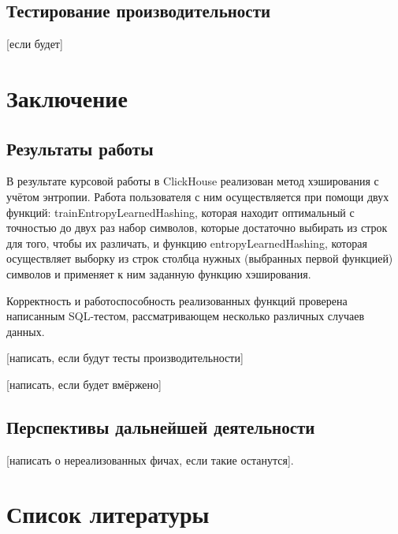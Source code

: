 \documentclass[a4paper,12pt]{extarticle}
\begin{document}
\cite{clickhouse_build_instruction}
\cite{clickhouse_architecture}
\cite{clickhouse_data_types}
\cite{clickhouse_reqular_functions}
\cite{clickhouse_aggregate_functions}
\cite{clickhouse_hash_functions}
\cite{clickhouse_hash_functions}
\cite{clickhouse_code_style_guide}
\cite{clickhouse_testing}
\cite{clickhouse_sql_test_queries}

\subsection{Тестирование производительности}
[если будет]

\newpage

\section{Заключение}
\subsection{Результаты работы}
В результате курсовой работы в ClickHouse реализован метод хэширования с учётом энтропии. Работа пользователя с ним осуществляется при помощи двух функций: trainEntropyLearnedHashing, которая находит оптимальный с точностью до двух раз набор символов, которые достаточно выбирать из строк для того, чтобы их различать, и функцию entropyLearnedHashing, которая осуществляет выборку из строк столбца нужных (выбранных первой функцией) символов и применяет к ним заданную функцию хэширования.

Корректность и работоспособность реализованных функций проверена написанным SQL-тестом, рассматривающем несколько различных случаев данных.

[написать, если будут тесты производительности]

[написать, если будет вмёржено]

\subsection{Перспективы дальнейшей деятельности}

[написать о нереализованных фичах, если такие останутся].

\newpage

\section{Список литературы}
\printbibliography[heading=none]
\newpage
\end{document}

